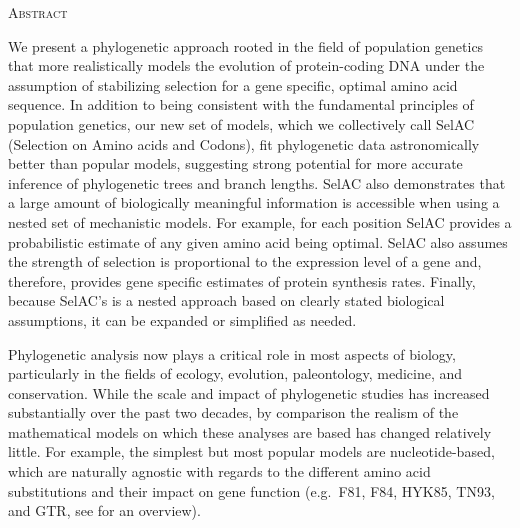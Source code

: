\documentclass[12pt,letterpaper]{article}
\renewcommand{\section}[1]{%
\bigskip
\begin{center}
\begin{Large}
\normalfont\scshape #1
\medskip
\end{Large}
\end{center}}
\begin{document}


\newpage

\section{Abstract}
We present a phylogenetic approach rooted in the field of population genetics that more realistically models the evolution of protein-coding DNA under the assumption of stabilizing selection for a gene specific, optimal amino acid sequence.
In addition to being consistent with the fundamental principles of population genetics, our new set of models, which we collectively call SelAC (Selection on Amino acids and Codons), fit phylogenetic data astronomically better than popular models, suggesting strong potential for more accurate inference of phylogenetic trees and branch lengths.
SelAC also demonstrates that a large amount of biologically meaningful information is accessible when using a nested set of mechanistic models.
For example, for each position SelAC provides a probabilistic estimate of any given amino acid being optimal.
SelAC also assumes the strength of selection is proportional to the expression level of a gene and, therefore, provides gene specific estimates of protein synthesis rates.
Finally, because SelAC's is a nested approach based on clearly stated biological assumptions, it can be expanded or simplified as needed.

\newpage




Phylogenetic analysis now plays a critical role in most aspects of biology, particularly in the fields of ecology, evolution, paleontology, medicine, and conservation.
While the scale and impact of phylogenetic studies has increased substantially over the past two decades, by comparison the realism of the mathematical models on which these analyses are based has changed relatively little.
For example, the simplest but most popular models are nucleotide-based, which are naturally agnostic with regards to the different amino acid substitutions and their impact on gene function (e.g.~F81, F84, HYK85, TN93, and GTR, see \citet{Yang2014} for an overview).
\end{document}
